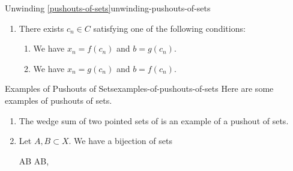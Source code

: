 \begin{remark}{Unwinding \cref{pushouts-of-sets}}{unwinding-pushouts-of-sets}
\begin{itemize}
\begin{itemize}
\begin{enumerate}
\begin{enumerate}
                                \item We have $x_{i}=g(c_{i})$ and $x_{i+1}=f(c_{i})$.
                            \end{enumerate}
                        \item There exists $c_{n}\in C$ satisfying one of the following conditions:
                            \begin{enumerate}
                                \item We have $x_{n}=f(c_{n})$ and $b=g(c_{n})$.
                                \item We have $x_{n}=g(c_{n})$ and $b=f(c_{n})$.
                            \end{enumerate}
                    \end{enumerate}
            \end{itemize}
    \end{itemize}
\end{remark}
\begin{example}{Examples of Pushouts of Sets}{examples-of-pushouts-of-sets}%
    Here are some examples of pushouts of sets.
    \begin{enumerate}
        \item\label{examples-of-pushouts-of-sets-wedge-sums-of-pointed-sets}The wedge sum of two pointed sets of  is an example of a pushout of sets.
        \item\label{examples-of-pushouts-of-sets-intersections-via-unions}Let $A,B\subset X$. We have a bijection of sets
            \begin{webcompile}
                A\cup B%
                \cong%
                AB,%
                \quad
            \end{webcompile}
    \end{enumerate}
\end{example}
